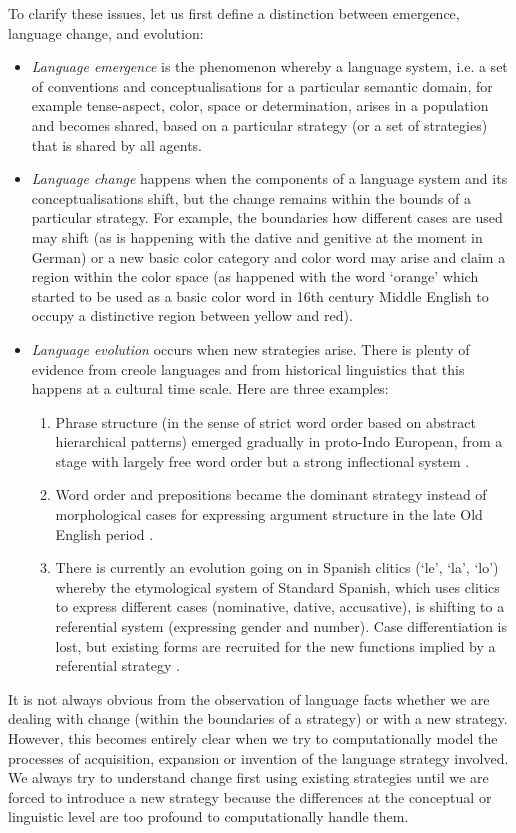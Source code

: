 To clarify these issues, let us first define a distinction between emergence, language change, and evolution:
\begin{itemize}
\item {\itshape Language emergence} is the phenomenon whereby a language system, i.e. a set of conventions and conceptualisations
for a particular semantic domain, for example tense-aspect, color, space or determination, arises in a population and 
becomes shared, based on a particular strategy (or a set of strategies) that is shared by all agents. 
\item {\itshape Language change} happens when the components of a language system and its conceptualisations shift, but the 
change remains within the bounds of a particular strategy. For example, the boundaries how different cases are used 
may shift (as is happening with the dative and genitive at the moment in German) or a new basic color category and
color word may arise and claim a region within the color space (as happened with the word `orange' which 
started to be used as a basic color word in 16th century Middle English to occupy a distinctive region between yellow and red). 
\item {\itshape Language evolution} occurs when new strategies arise. There is plenty of evidence from creole languages and 
from historical linguistics that this happens at a cultural time scale. Here are three examples:
\begin{enumerate}
\item Phrase structure (in the sense of 
strict word order based on abstract hierarchical patterns) emerged gradually in 
proto-Indo European, from a stage with largely free word order but a strong inflectional system \citep{VandeVelde:2011}. 
\item Word order and prepositions became the dominant strategy instead of morphological cases 
for expressing argument structure in the late Old English period \citep{VanKemenade:1987}. 
\item There is currently an evolution going on in Spanish clitics (`le', `la', `lo') whereby the etymological system 
of Standard Spanish, which uses clitics to express different cases (nominative, dative, accusative), is shifting 
to a referential system (expressing gender and number). Case differentiation is lost, but existing forms are recruited
for the new functions implied by a referential strategy  \citep{Fernandez-Ordonez:1999}. 
\end{enumerate}
\end{itemize}
It is not always obvious from the observation of language facts whether we are dealing with change (within the boundaries 
of a strategy) or with a new strategy. However, this becomes entirely clear when we try to computationally model the processes of 
acquisition, expansion or invention of the language strategy involved. We always try to understand change first using existing 
strategies until we are forced to introduce a new strategy because the differences at the conceptual or linguistic 
level are too profound to computationally handle them. 


